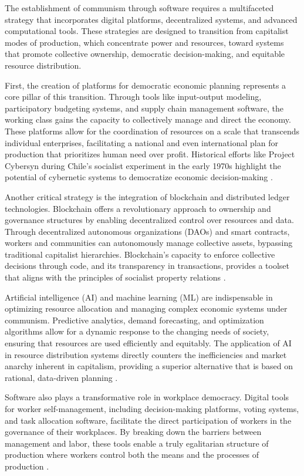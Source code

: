 \begin{refsection}
The establishment of communism through software requires a multifaceted strategy that incorporates digital platforms, decentralized systems, and advanced computational tools. These strategies are designed to transition from capitalist modes of production, which concentrate power and resources, toward systems that promote collective ownership, democratic decision-making, and equitable resource distribution.

First, the creation of platforms for democratic economic planning represents a core pillar of this transition. Through tools like input-output modeling, participatory budgeting systems, and supply chain management software, the working class gains the capacity to collectively manage and direct the economy. These platforms allow for the coordination of resources on a scale that transcends individual enterprises, facilitating a national and even international plan for production that prioritizes human need over profit. Historical efforts like Project Cybersyn during Chile's socialist experiment in the early 1970s highlight the potential of cybernetic systems to democratize economic decision-making \cite[pp.~198-200]{medina2011}.

Another critical strategy is the integration of blockchain and distributed ledger technologies. Blockchain offers a revolutionary approach to ownership and governance structures by enabling decentralized control over resources and data. Through decentralized autonomous organizations (DAOs) and smart contracts, workers and communities can autonomously manage collective assets, bypassing traditional capitalist hierarchies. Blockchain’s capacity to enforce collective decisions through code, and its transparency in transactions, provides a toolset that aligns with the principles of socialist property relations \cite[pp.~12-14]{wright2018}.

Artificial intelligence (AI) and machine learning (ML) are indispensable in optimizing resource allocation and managing complex economic systems under communism. Predictive analytics, demand forecasting, and optimization algorithms allow for a dynamic response to the changing needs of society, ensuring that resources are used efficiently and equitably. The application of AI in resource distribution systems directly counters the inefficiencies and market anarchy inherent in capitalism, providing a superior alternative that is based on rational, data-driven planning \cite[pp.~126-131]{cockshott1993}.

Software also plays a transformative role in workplace democracy. Digital tools for worker self-management, including decision-making platforms, voting systems, and task allocation software, facilitate the direct participation of workers in the governance of their workplaces. By breaking down the barriers between management and labor, these tools enable a truly egalitarian structure of production where workers control both the means and the processes of production \cite[pp.~44-46]{schweickart2002}.


\end{refsection}
